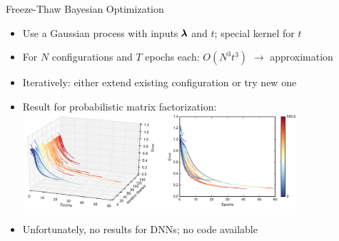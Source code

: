 \begin{frame}{Freeze-Thaw Bayesian Optimization }
\begin{itemize}

	\item Use a Gaussian process with inputs $\pmb{\lambda}$ and $t$; special kernel for $t$
	\item For $N$ configurations and $T$ epochs each: $O(N^3 t^3)$ $\rightarrow$ approximation
	\item Iteratively: either extend existing configuration or try new one
\pause
	\item Result for probabilistic matrix factorization:
	\includegraphics[width=0.8\textwidth]{../w07_hpo_speedup/images/learningcurve/FTBO.png}
\pause
	\item Unfortunately, no results for DNNs; no code available
\end{itemize}


\end{frame}





